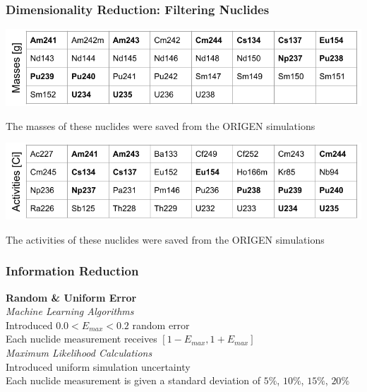 \begin{frame}
  \frametitle{Dimensionality Reduction: Filtering Nuclides}
    \begin{table}
      \centering
      \includegraphics[width=\linewidth]{./figures/nuclist_featureset_masses.png}
      \caption{The masses of these nuclides were saved from the ORIGEN simulations}
    \end{table}
    \begin{table}
      \centering
      \includegraphics[width=\linewidth]{./figures/nuclist_featureset_activities.png}
      \caption{The activities of these nuclides were saved from the ORIGEN simulations}
    \end{table}
\end{frame}


\begin{frame}
  \frametitle{Information Reduction}
  \textbf{\large Random \& Uniform Error} \\
  \bigskip
  \textit{Machine Learning Algorithms} \\ \smallskip
  Introduced $0.0 < E_{max} < 0.2$ random error\\
  Each nuclide measurement receives $[1-E_{max},1+E_{max}]$\\
  \bigskip
  \textit{Maximum Likelihood Calculations} \\ \smallskip
  Introduced uniform simulation uncertainty\\
  Each nuclide measurement is given a standard deviation of $5\%$, $10\%$, $15\%$, $20\%$ \\
\end{frame}

